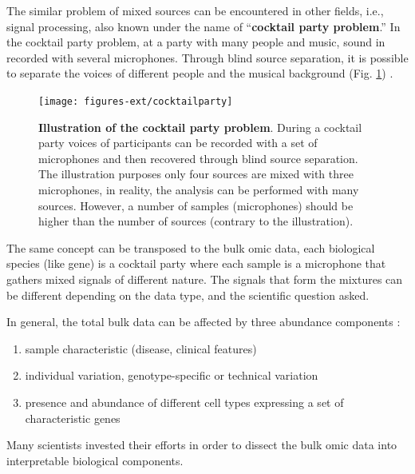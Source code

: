 \documentclass[12pt,]{book}
\providecommand{\tightlist}{%
  \setlength{\itemsep}{0pt}\setlength{\parskip}{0pt}}
\theoremstyle{definition}
\theoremstyle{definition}
\theoremstyle{definition}
\theoremstyle{remark}
\begin{document}
The similar problem of mixed sources can be encountered in other fields,
i.e., signal processing, also known under the name of ``\textbf{cocktail
party problem}.'' In the cocktail party problem, at a party with many
people and music, sound in recorded with several microphones. Through
blind source separation, it is possible to separate the voices of
different people and the musical background (Fig.
\ref{fig:cocktailparty}) \citep{Cherry1953}.

\begin{figure}

{\centering \texttt{[image: figures-ext/cocktailparty]} 

}

\caption[Illutration of the cocktail party problem]{\textbf{Illustration of the cocktail party
problem}. During a cocktail party voices of participants can be recorded
with a set of microphones and then recovered through blind source
separation. The illustration purposes only four sources are mixed with
three microphones, in reality, the analysis can be performed with many
sources. However, a number of samples (microphones) should be higher
than the number of sources (contrary to the illustration).}\label{fig:cocktailparty}
\end{figure}









The same concept can be transposed to the bulk omic data, each
biological species (like gene) is a cocktail party where each sample is
a microphone that gathers mixed signals of different nature. The signals
that form the mixtures can be different depending on the data type, and
the scientific question asked.

In general, the total bulk data can be affected by three abundance
components \citep{Shen-Orr2013}:

\begin{enumerate}
\def\labelenumi{\arabic{enumi}.}
\tightlist
\item
  sample characteristic (disease, clinical features)
\item
  individual variation, genotype-specific or technical variation
\item
  presence and abundance of different cell types expressing a set of
  characteristic genes
\end{enumerate}

Many scientists invested their efforts in order to dissect the bulk omic
data into interpretable biological components.
\end{document}
